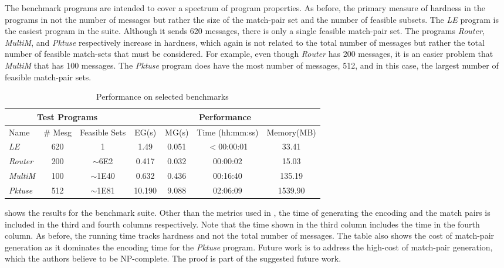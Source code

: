 The benchmark programs are intended to cover a spectrum of program properties. As before, the primary measure of hardness in the programs in not the number of messages but rather the size of the match-pair set and the number of feasible subsets.  The \textit{LE} program is the easiest program in the suite. Although it sends 620 messages, there is only a single feasible match-pair set. The programs \textit{Router}, \textit{MultiM}, and \textit{Pktuse} respectively increase in hardness, which again is not related to the total number of messages but rather the total number of feasible match-sets that must be considered. For example, even though \textit{Router} has 200 messages, it is an easier problem that \textit{MultiM} that has 100 messages. The \textit{Pktuse} program does have the most number of messages, 512, and in this case, the largest number of feasible match-pair sets.

\begin{table}[h]
\begin{center}
\setlength{\tabcolsep}{2pt}
\scriptsize
\caption{Performance on selected benchmarks \label{table:second}}
\begin{tabular}{|l|c|c|c|c|c|c|}
		\hline
         \multicolumn{3}{|c|}{Test Programs} & \multicolumn{4}{|c|}{Performance} \\ \hline
         Name & \# Mesg & Feasible Sets & EG(s) & MG(s) & Time (hh:mm:ss) & Memory(MB) \\ \hline
         \textit{LE} & 620 & 1 & 1.49 & 0.051 & $<$00:00:01 & 33.41  \\ %
         \textit{Router} & 200 & $\sim$6E2 & 0.417 & 0.032 & 00:00:02 & 15.03  \\ %
         \textit{MultiM} & 100 & $\sim$1E40 & 0.632 & 0.436 &  00:16:40 & 135.19  \\ %
         \textit{Pktuse} & 512 & $\sim$1E81 & 10.190 & 9.088 & 02:06:09 & 1539.90 \\ %
         \hline
		\end{tabular}
\end{center}
\end{table}

 shows the results for the benchmark suite. Other than the metrics used in , the time of generating the encoding and the match pairs is included in the third and fourth columns respectively. Note that the time shown in the third column includes the time in the fourth column. As before, the running time tracks hardness and not the total number of messages. The table also shows the cost of match-pair generation as it dominates the encoding time for the \textit{Pktuse} program. Future work is to address the high-cost of match-pair generation, which the authors believe to be NP-complete. The proof is part of the suggested future work.

